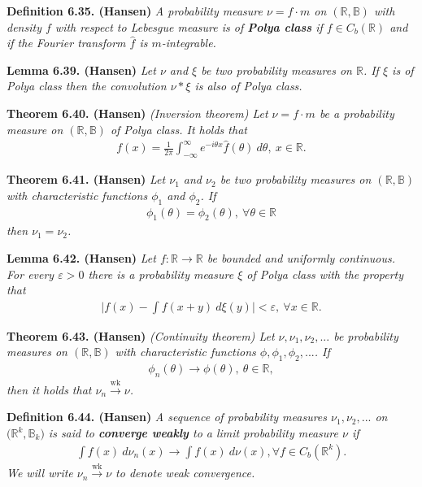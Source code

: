 \documentclass[
]{book}
\begin{document}
\textbf{Definition 6.35. (Hansen)} \emph{A probability measure \(\nu=f\cdot m\) on \((\mathbb{R},\mathbb{B})\) with density \(f\) with respect to Lebesgue measure is of \textbf{Polya class} if \(f\in C_b(\mathbb{R})\) and if the Fourier transform \(\hat{f}\) is \(m\)-integrable.}

\textbf{Lemma 6.39. (Hansen)} \emph{Let \(\nu\) and \(\xi\) be two probability measures on \(\mathbb{R}\). If \(\xi\) is of Polya class then the convolution \(\nu *\xi\) is also of Polya class.}

\textbf{Theorem 6.40. (Hansen)} \emph{(Inversion theorem) Let \(\nu=f\cdot m\) be a probability measure on \((\mathbb{R},\mathbb{B})\) of Polya class. It holds that}
\begin{align*}
    f(x)=\frac{1}{2\pi}\int_{-\infty}^\infty e^{-i\theta x}\hat{f}(\theta)\ d\theta,\ x\in\mathbb{R}.\tag{6.39}
\end{align*}

\textbf{Theorem 6.41. (Hansen)} \emph{Let \(\nu_1\) and \(\nu_2\) be two probability measures on \((\mathbb{R},\mathbb{B})\) with characteristic functions \(\phi_1\) and \(\phi_2\). If}
\begin{align*}
    \phi_1(\theta)=\phi_2(\theta),\ \forall \theta \in\mathbb{R}
\end{align*}
\emph{then \(\nu_1=\nu_2\).}

\textbf{Lemma 6.42. (Hansen)} \emph{Let \(f : \mathbb{R}\to\mathbb{R}\) be bounded and uniformly continuous. For every \(\varepsilon>0\) there is a probability measure \(\xi\) of Polya class with the property that}
\begin{align*}
    \Big\vert f(x)-\int f(x+y)\ d\xi(y)\Big\vert<\varepsilon,\ \forall x\in\mathbb{R}.\tag{6.43}
\end{align*}

\textbf{Theorem 6.43. (Hansen)} \emph{(Continuity theorem) Let \(\nu,\nu_1,\nu_2,...\) be probability measures on \((\mathbb{R},\mathbb{B})\) with characteristic functions \(\phi,\phi_1,\phi_2,...\). If}
\begin{align*}
    \phi_n(\theta)\to \phi(\theta),\ \theta\in\mathbb{R},\tag{6.45}
\end{align*}
\emph{then it holds that \(\nu_n\stackrel{\text{wk}}{\to}\nu\).}

\textbf{Definition 6.44. (Hansen)} \emph{A sequence of probability measures \(\nu_1,\nu_2,...\) on \(\big(\mathbb{R}^k,\mathbb{B}_k\big)\) is said to \textbf{converge weakly} to a limit probability measure \(\nu\) if}
\begin{align*}
    \int f(x)\ d\nu_n(x)\to\int f(x)\ d\nu(x), \forall f\in C_b(\mathbb{R}^k).\tag{6.46}
\end{align*}
\emph{We will write \(\nu_n\stackrel{\text{wk}}{\to}\nu\) to denote weak convergence.}
\end{document}

